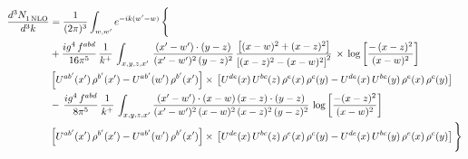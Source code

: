 \documentclass[9pt]{article}
\numberwithin{equation}{section}
\begin{document}
\begin{align}
   \frac{d^{3}N_{1\,\rm NLO}^{\rm}}{d^{3}k}  & =  \frac{1}{(2\pi)^{3}}  \int_{w, w^\prime} e^{-ik(w^\prime-w)}\, \Bigg\{\notag \\
&  +\frac{ig^{4}\,f^{abd}}{16\pi^{5}}\, \frac{1}{k^{+}}\,\int_{x,y,z,x'}\, \frac{(x'-w')\cdot (y-z)}{(x'-w')^{2}\,(y-z)^{2}}\, \frac{\left[(x-w)^{2}+(x-z)^{2}\right]}{\left[(x-z)^{2}-(x-w)^{2}\right]^{2}}\, \times\, \log{\left[\frac{-\,(x-z)^{2}}{(x-w)^{2}}\right]}\notag \\ & \left[U^{ab'}(x')\,\rho^{b'}(x')-U^{ab'}(w')\, \rho^{b'}(x')\right]\times\, \left[U^{de}(x)\,U^{bc}(z)\, \rho^{e}(x)\,\rho^{c}(y)-U^{de}(x)\,U^{bc}(y)\,\rho^{e}(x)\,\rho^{c}(y)\right] \notag \\
& -\, \frac{ig^{4}\,f^{abd}}{8\pi^{5}}\,\frac{1}{k^{+}}\,\int_{x,y,z,x'}\frac{(x'-w')\cdot (x-w)\, (x-z)\cdot (y-z)}{(x'-w')^{2}\, (x-w)^{2}\, (x-z)^{2}\, (y-z)^{2}}\,\log{\left[\frac{-(x-z)^{2}}{(x-w)^{2}}\right]} \notag \\ & \left[U^{ab'}(x')\,\rho^{b'}(x')-U^{ab'}(w')\, \rho^{b'}(x')\right]\times\, \left[U^{de}(x)\,U^{bc}(z)\, \rho^{e}(x)\,\rho^{c}(y)-U^{de}(x)\,U^{bc}(y)\,\rho^{e}(x)\,\rho^{c}(y)\right]\Bigg\}
\end{align}
\end{document}
